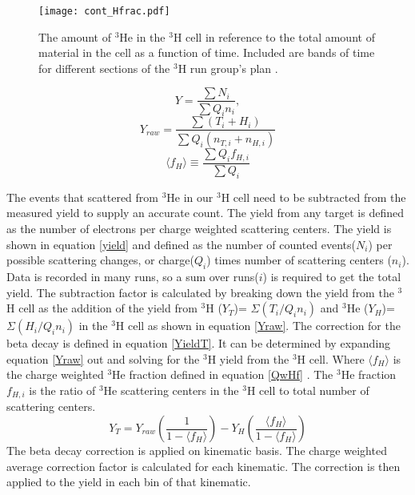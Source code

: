 \begin{figure}[t]
	\centering

	\texttt{[image: cont\_Hfrac.pdf]}
	
	\caption{The amount of $^3$He in the $^3$H cell in reference to the total amount of material in the cell as a function of time. Included are bands of time for different sections of the $^3$H run group's plan \cite{Beta}.}
	\label{Hfract}
\end{figure}
\begin{equation}
Y = \frac{\sum N_i}{\sum Q_i n_i}, \label{yield} 
\end{equation}
\begin{equation}
Y_{raw} = \frac{\sum (T_i + H_i)}{\sum Q_i (n_{T,i} + n_{H,i})} \label{Yraw}
\end{equation}
\begin{equation}
\langle f_H \rangle \equiv \frac{\sum Q_i f_{H,i}}{\sum Q_i} \label{QwHf}
\end{equation}


The events that scattered from $^3$He in our $^3$H cell need to be subtracted from the measured yield to supply an accurate count. The yield from any target is defined as the number of electrons per charge weighted scattering centers. The yield is shown in equation \ref{yield} and defined as the number of counted events($N_i$) per possible scattering changes, or charge($Q_i$) times number of scattering centers ($n_i$). Data is recorded in many runs, so a sum over runs($i$) is required to get the total yield. The subtraction factor is calculated by breaking down the yield from the $^3$H cell as the addition of the yield from $^3$H ($Y_T$)= $\Sigma(T_i/Q_in_{i})$ and $^3$He ($Y_H$)= $\Sigma(H_i/Q_in_{i})$ in the $^3$H cell as shown in equation \ref{Yraw}. The correction for the beta decay is defined in equation \ref{YieldT}. It can be determined by expanding equation \ref{Yraw} out and solving for the $^3$H yield from the $^3$H cell. Where $\langle f_H \rangle$ is the charge weighted $^3$He fraction defined in equation \ref{QwHf} \cite{primer}. The $^3$He fraction $f_{H,i}$ is the ratio of $^3$He scattering centers in the $^3$H cell to total number of scattering centers. 
\begin{equation}
Y_T = Y_{raw}\left(\frac{1}{1-\langle f_H \rangle}\right) - Y_H \left(\frac{\langle f_H \rangle}{1-\langle f_H \rangle}\right) \label{YieldT}
\end{equation}
The beta decay correction is applied on kinematic basis. The charge weighted average correction factor is calculated for each kinematic. The correction is then applied to the yield in each bin of that kinematic. 


